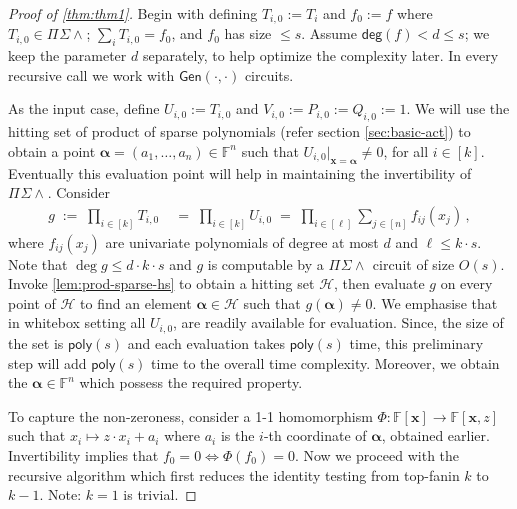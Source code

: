 \documentclass[10pt,a4paper]{article}
\newcommand{\poly}{\mathsf{poly}}
\newcommand{\F}{\mathbb{F}}
\newcommand{\x}{{\boldsymbol x}}
\newcommand{\alphavec}{\boldsymbol \alpha}
\newcommand{\calH}{\mathcal{H}}
\newcommand{\pdeg}{\mathsf{deg}}
\newcommand{\PSU}[2]{\Pi^{#1} \Sigma\wedge^{#2}}
\newcommand{\Gen}[2]{\mathsf{Gen}(#1,#2)}
\numberwithin{equation}{section}
\begin{document}
\begin{proof}[Proof of \autoref{thm:thm1}] 
Begin with defining $T_{i,0}:=T_i$ and $f_{0}:=f$ where $T_{i,0} \in \PSU{}{}$;  $\sum_{i} T_{i,0}=f_0$, and $f_0$ has size $\le s$. Assume $\pdeg(f)<d\le s$; we keep the parameter $d$ separately, to help optimize the complexity later. In every recursive call we work with $\Gen{\cdot}{\cdot}$ circuits. 

As the input case, define $U_{i,0}:=T_{i,0}$ and $V_{i,0}:=P_{i,0}:= Q_{i,0}:=1$. We will use the hitting set of product of sparse polynomials (refer section \ref{sec:basic-act}) to obtain a point $\alphavec = (a_1, \dots, a_n) \in \F^n$ such that $U_{i,0} \rvert_{\x = \alphavec} \neq 0$, for all $i \in [k]$. Eventually this evaluation point will help in maintaining the invertibility of $\PSU{}{}$. Consider
\begin{align*}
    g \;:=\; \prod_{i \in [k]} T_{i,0} &\;=\; \prod_{i \in [k]} U_{i,0} \;=\; \prod_{i \in [\ell]} \sum_{j \in [n]} f_{ij}(x_j)\,,
\end{align*}
where $f_{ij}(x_j)$ are univariate polynomials of degree at most $d$ and $\ell \leq k \cdot s$. Note that $\deg g \leq d \cdot k \cdot s$ and $g$ is computable by a $\PSU{}{}$ circuit of size $O(s)$. Invoke \autoref{lem:prod-sparse-hs} to obtain a hitting set $\calH$, then evaluate $g$ on every point of $\calH$ to find an element $\alphavec \in \calH$ such that $g(\alphavec) \neq 0$. We emphasise that in whitebox setting all $U_{i,0}$, are readily available for evaluation. Since, the size of the set is $\poly(s)$ and each evaluation takes $\poly(s)$ time, this preliminary step will add $\poly(s)$ time to the overall time complexity. Moreover, we obtain the $\alphavec \in \F^n$ which possess the required property. 

To capture the non-zeroness, consider a 1-1 homomorphism $\Phi : \F[\x] \longrightarrow \F[\x,z]$ such that $x_i \mapsto z\cdot x_i + a_i$ where $a_i$ is the $i$-th coordinate of $\alphavec$, obtained earlier. Invertibility implies that $f_{0} = 0 \iff \Phi(f_{0}) = 0$. 
%
%
Now we proceed with the recursive algorithm which first reduces the identity testing from top-fanin $k$ to $k-1$. Note: $k=1$ is trivial.


\end{proof}
\end{document}

